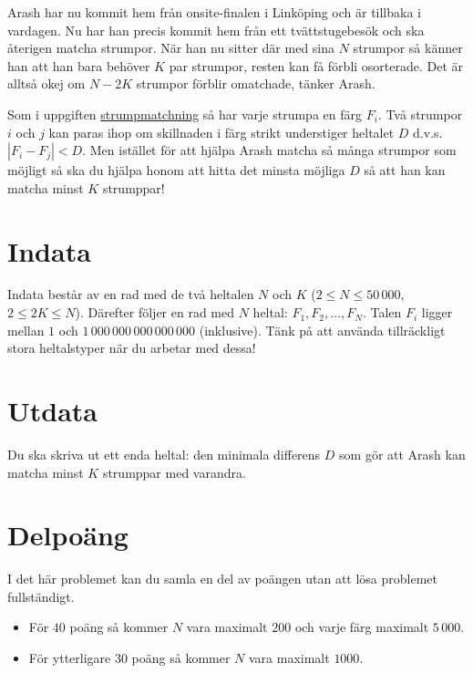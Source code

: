 
Arash har nu kommit hem från onsite-finalen i Linköping och är tillbaka i
vardagen. Nu har han precis kommit hem från ett tvättstugebesök och ska
återigen matcha strumpor. När han nu sitter där med sina $N$ strumpor
så känner han att han bara behöver $K$ par strumpor, resten kan få förbli
osorterade. Det är alltså okej om $N-2K$ strumpor förblir omatchade, tänker Arash.

Som i uppgiften \href{https://po.scrool.se/problems/strumpor}{strumpmatchning}
så har varje strumpa en färg $F_i$. Två strumpor $i$ och $j$ kan paras ihop om
skillnaden i färg strikt understiger heltalet $D$ d.v.s. $|F_{i} - F_{j}|<D$.
Men istället för att hjälpa Arash matcha så många strumpor som möjligt så ska
du hjälpa honom att hitta det minsta möjliga $D$
så att han kan matcha minst $K$ strumppar!

\section*{Indata}

Indata består av en rad med de två heltalen $N$ och $K$ ($2 \le N
\le 50\,000$, $2 \le 2K \le N$). Därefter följer en rad med $N$
heltal: $F_1, F_2, \dots, F_N$. Talen $F_i$ ligger mellan $1$
och $1\,000\,000\,000\,000\,000$ (inklusive). Tänk på att använda
tillräckligt stora heltalstyper när du arbetar med dessa!

\section*{Utdata}

Du ska skriva ut ett enda heltal: den minimala differens $D$ som gör att Arash kan
matcha minst $K$ strumppar med varandra.

\section*{Delpoäng}

I det här problemet kan du samla en del av poängen utan att lösa
problemet fullständigt.

\begin{itemize}
    \item För $40$ poäng så kommer $N$ vara maximalt $200$ och varje färg maximalt $5\,000$.
    \item För ytterligare $30$ poäng så kommer $N$ vara maximalt $1000$.
\end{itemize}
